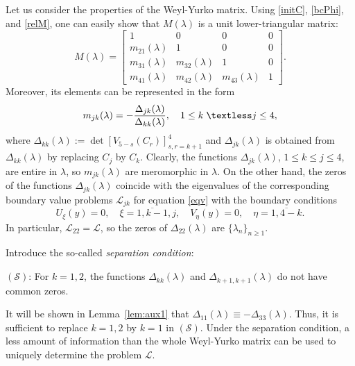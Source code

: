 \documentclass[a4paper,12pt]{article}
\newcommand{\la}{\lambda}
\theoremstyle{plain}
\numberwithin{equation}{section}
\theoremstyle{definition}
\theoremstyle{remark}
\begin{document}
Let us consider the properties of the Weyl-Yurko matrix. Using \eqref{initC}, \eqref{bcPhi}, and \eqref{relM}, one can easily show that $M(\la)$ is a unit lower-triangular matrix:
\begin{equation} \label{matrM}
M(\la) = \begin{bmatrix}
            1 & 0 & 0 & 0 \\
            m_{21}(\la) & 1 & 0 &  0 \\
            m_{31}(\la) & m_{32}(\la) & 1 & 0 \\
            m_{41}(\la) & m_{42}(\la) & m_{43}(\la) & 1
        \end{bmatrix}.
\end{equation}
Moreover, its elements can be represented in the form
\begin{equation} \label{mjk}
m_{jk}(\lambda)=-\frac{\Delta_{jk}(\lambda)}{\Delta_{kk}(\lambda)}, \quad 1\leq k \;\textless j \leq 4,
\end{equation}
where $\Delta_{kk}(\lambda):=\det[V_{5-s}(C_{r})]_{s,r=k+1}^{4}$ and $\Delta_{jk}(\lambda)$ is obtained from $\Delta_{kk}(\lambda)$ by replacing $C_{j}$ by $C_{k}$. Clearly, the functions $\Delta_{jk}(\la)$, $1 \le k \le j \le 4$, are entire in $\la$, so $m_{jk}(\la)$ are meromorphic in $\la$. On the other hand, the zeros of the functions $\Delta_{jk}(\la)$ coincide with the eigenvalues of the corresponding boundary value problems $\mathcal L_{jk}$ for equation \eqref{eqv} with the boundary conditions
\begin{equation} \label{bcjk}
U_{\xi}(y)=0, \quad \xi=\overline{1,k-1},j, \quad V_{\eta}(y)=0, \quad \eta=\overline{1, 4-k}.
\end{equation}
In particular, $\mathcal L_{22} = \mathcal L$, so the zeros of $\Delta_{22}(\la)$ are $\{ \la_n \}_{n \ge 1}$.

Introduce the so-called \textit{separation condition}:

\smallskip

$(\mathcal S)$: For $k = 1, 2$, the functions $\Delta_{kk}(\la)$ and $\Delta_{k+1,k+1}(\la)$ do not have common zeros.

\smallskip

It will be shown in Lemma~\ref{lem:aux1} that $\Delta_{11}(\la) \equiv -\Delta_{33}(\la)$. Thus, it is sufficient to replace $k = 1, 2$ by $k = 1$ in $(\mathcal S)$. Under the separation condition, a less amount of information than the whole Weyl-Yurko matrix can be used to uniquely determine the problem $\mathcal L$. 
\end{document}
